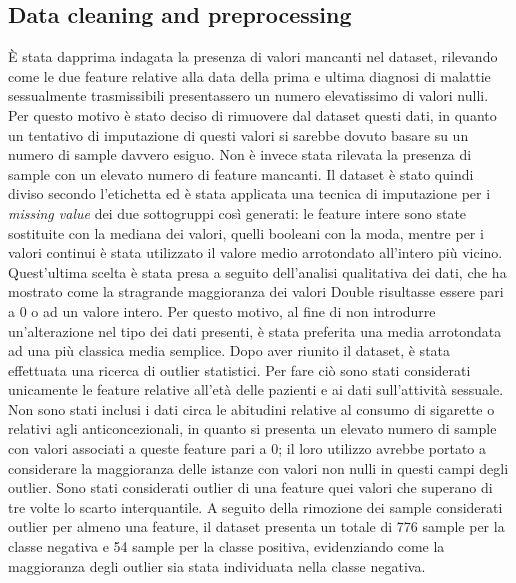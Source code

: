 \subsection{Data cleaning and preprocessing}
È stata dapprima indagata la presenza di valori mancanti nel dataset, rilevando come le due feature relative alla data della prima e ultima diagnosi di malattie sessualmente trasmissibili presentassero un numero elevatissimo di valori nulli.
Per questo motivo è stato deciso di rimuovere dal dataset questi dati, in quanto un tentativo di imputazione di questi valori si sarebbe dovuto basare su un numero di sample davvero esiguo. Non è invece stata rilevata la presenza di sample con un elevato numero di feature mancanti.
Il dataset è stato quindi diviso secondo l'etichetta ed è stata applicata una tecnica di imputazione per i \textit{missing value} dei due sottogruppi così generati: le feature intere sono state sostituite con la mediana dei valori, quelli booleani con la moda, mentre per i valori continui è stata utilizzato il valore medio arrotondato all'intero più vicino. Quest'ultima scelta è stata presa a seguito dell'analisi qualitativa dei dati, che ha mostrato come la stragrande maggioranza dei valori Double  risultasse essere pari a 0 o ad un valore intero. Per questo motivo, al fine di non introdurre un'alterazione nel tipo dei dati presenti, è stata preferita una media arrotondata ad una più classica media semplice.
Dopo aver riunito il dataset, è stata effettuata una ricerca di outlier statistici.
Per fare ciò sono stati considerati unicamente le feature relative all'età delle pazienti e ai dati sull'attività sessuale. Non sono stati inclusi i dati circa le abitudini relative al consumo di sigarette o relativi agli anticoncezionali, in quanto si presenta un elevato numero di sample con valori associati a queste feature pari a $0$; il loro utilizzo avrebbe portato a considerare la maggioranza delle istanze con valori non nulli in questi campi degli outlier. Sono stati considerati outlier di una feature quei valori che superano di tre volte lo scarto interquantile. 
A seguito della rimozione dei sample considerati outlier per almeno una feature, il dataset presenta un totale di 776 sample per la classe negativa e 54 sample per la classe positiva, evidenziando come la maggioranza degli outlier sia stata individuata nella classe negativa.